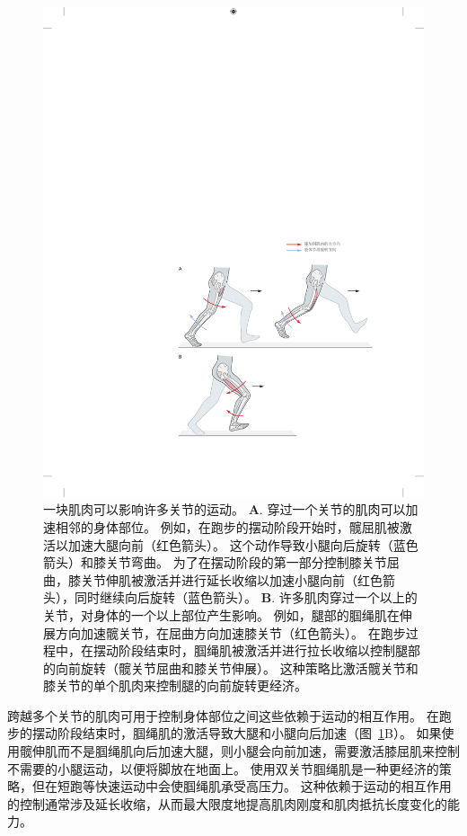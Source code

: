 \begin{figure}[htbp]
	\centering
	\includegraphics[width=0.82\linewidth]{chap31/fig_31_16}
	\caption{一块肌肉可以影响许多关节的运动。
	\textbf{A}. 穿过一个关节的肌肉可以加速相邻的身体部位。
	例如，在跑步的摆动阶段开始时，髋屈肌被激活以加速大腿向前（红色箭头）。
	这个动作导致小腿向后旋转（蓝色箭头）和膝关节弯曲。
	为了在摆动阶段的第一部分控制膝关节屈曲，膝关节伸肌被激活并进行延长收缩以加速小腿向前（红色箭头），同时继续向后旋转（蓝色箭头）。
	\textbf{B}. 许多肌肉穿过一个以上的关节，对身体的一个以上部位产生影响。
	例如，腿部的腘绳肌在伸展方向加速髋关节，在屈曲方向加速膝关节（红色箭头）。
	在跑步过程中，在摆动阶段结束时，腘绳肌被激活并进行拉长收缩以控制腿部的向前旋转（髋关节屈曲和膝关节伸展）。
	这种策略比激活髋关节和膝关节的单个肌肉来控制腿的向前旋转更经济。}
	\label{fig:31_16}
\end{figure}


跨越多个关节的肌肉可用于控制身体部位之间这些依赖于运动的相互作用。
在跑步的摆动阶段结束时，腘绳肌的激活导致大腿和小腿向后加速（图~\ref{fig:31_16}B）。
如果使用髋伸肌而不是腘绳肌向后加速大腿，则小腿会向前加速，需要激活膝屈肌来控制不需要的小腿运动，以便将脚放在地面上。
使用双关节腘绳肌是一种更经济的策略，但在短跑等快速运动中会使腘绳肌承受高压力。
这种依赖于运动的相互作用的控制通常涉及延长收缩，从而最大限度地提高肌肉刚度和肌肉抵抗长度变化的能力。



